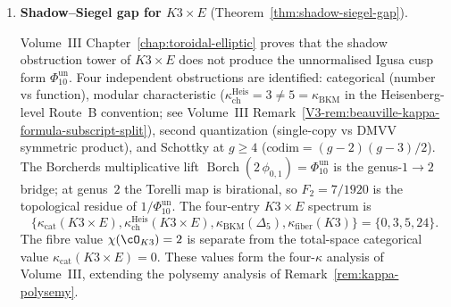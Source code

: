 \begin{enumerate}[resume, label=\textup{(\arabic*)}]
 \smallskip\noindent
 \emph{$\Theta^{\mathrm{oc}}$ reformulation.}
 The arithmetic packet connection
 $\nabla^{\mathrm{arith}}_\cA$ on the module $M_\cA$ over the
 spectral $s$-line is defined from the shadow spectral measure.
 The conjecture asserts a canonical map from the closed-sector
 tower to the connection:
 \begin{quote}
 \emph{The genus-$g$ components of
 $\pi_{\mathrm{cl}}(\Theta^{\mathrm{oc}}_\cA)$
 for $g \geq 2$ determine the residues of the frontier defect
 form $\Omega_\cA$ at scattering poles, conditional on the genus-$g$
 Saito--Kurokawa projection and the B\"ocherer bridge
 $($Theorem~\textup{\ref{thm:bocherer-bridge}}$)$.}
 \end{quote}
 The genus-$2$ case is the first nontrivial instance: the
 three-shell decomposition of $\Theta_\cA|_{g=2}$ produces
 the Siegel modular form whose Fourier coefficients encode
 central $L$-values
 (Theorem~\ref{thm:leech-chi12-projection}).

\item \textbf{Shadow--Siegel gap for $K3 \times E$}
 (Theorem~\ref{thm:shadow-siegel-gap}).

 \smallskip\noindent
 Volume~III Chapter~\ref{chap:toroidal-elliptic} proves that the
 shadow obstruction tower of $K3 \times E$ does not
 produce the unnormalised Igusa cusp form $\Phi_{10}^{\mathrm{un}}$.
 Four independent
 obstructions are identified: categorical (number vs function),
 modular characteristic ($\kappa_{\mathrm{ch}}^{\mathrm{Heis}} = 3 \neq 5 = \kappa_{\mathrm{BKM}}$
 in the Heisenberg-level Route~B convention; see Volume~III
 Remark~\ref{V3-rem:beauville-kappa-formula-subscript-split}),
 second quantization (single-copy vs DMVV symmetric product),
 and Schottky at $g \geq 4$ ($\mathrm{codim} = (g{-}2)(g{-}3)/2$).
 The Borcherds multiplicative lift
 $\operatorname{Borch}(2\,\phi_{0,1}) = \Phi_{10}^{\mathrm{un}}$ is the
 genus-$1 \to 2$ bridge; at genus~$2$ the Torelli map is
 birational, so $F_2 = 7/1920$ is the topological residue of
 $1/\Phi_{10}^{\mathrm{un}}$. The four-entry $K3\times E$
 spectrum is
 \[
  \{\kappa_{\mathrm{cat}}(K3\times E),
    \kappa_{\mathrm{ch}}^{\mathrm{Heis}}(K3\times E),
    \kappa_{\mathrm{BKM}}(\Delta_5),
    \kappa_{\mathrm{fiber}}(K3)\}
 =\{0,3,5,24\}.
 \]
 The fibre value $\chi(\cO_{K3})=2$ is separate from the
 total-space categorical value
 $\kappa_{\mathrm{cat}}(K3\times E)=0$. These values form the
 four-$\kappa$ analysis of Volume~III, extending the
 polysemy analysis of Remark~\ref{rem:kappa-polysemy}.


\end{enumerate}
